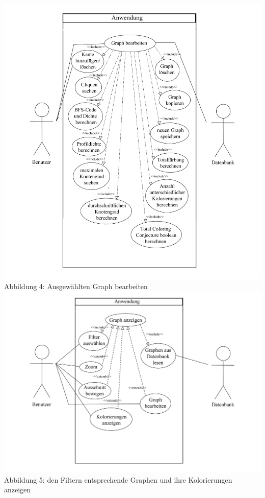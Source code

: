 \documentclass[13pt]{scrreprt}
\begin{document}
\includegraphics[scale=0.75]{Graph_bearbeiten.jpg}
\centering Abbildung 4: Ausgewählten Graph bearbeiten
\\
\newpage
\includegraphics[scale=0.75]{Graph_anzeigen.jpg}
\centering Abbildung 5: den Filtern entsprechende Graphen und ihre Kolorierungen anzeigen
\\
\end{document}
